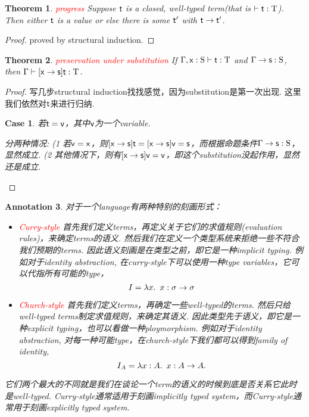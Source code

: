 \documentclass{article}
\theoremstyle{plain}
\newtheorem{theorem}{Theorem}
\newtheorem{annotation}[theorem]{Annotation}
\newtheorem{case}{Case}
\theoremstyle{nonumberplain}
\newtheorem{proof}{Proof}
\newcommand{\lam}[2]{\ensuremath{\lambda #1\ldotp~ #2}} %
\newcommand{\singletype}[1]{\text{#1}}
\newcommand{\termtype}[2]{\ensuremath{#1:#2}}
\newcommand{\term}[1]{\ensuremath\mathsf{#1}}
\newcommand{\redt}[1]{\textcolor{red}{#1}}
\begin{document}
\begin{theorem}
\rm \redt{progress} Suppose $\term{t}$ is a closed, well-typed term(that is $\vdash \termtype{\term{t}}{\singletype{T}}$). Then either $\term{t}$ is a value or else there is some $\term{t}'$ with $\term{t} \to \term{t}'$. 
\end{theorem}

\begin{proof}
proved by structural induction.
\end{proof}

\begin{theorem}
\rm \redt{preservation under substitution} If $\Gamma,  \termtype{\term{x}}{\singletype{S}} \vdash \termtype{\term{t}}{\singletype{T}}$ and $\Gamma \to \termtype{\term{s}}{\singletype{S}}$, then $\Gamma \vdash \termtype{[\term{x} \to \term{s}]\term{t}}{\singletype{T}}$.
\end{theorem}

\begin{proof}
\rm 写几步structural induction找找感觉，因为substitution是第一次出现. 这里我们依然对$\term{t}$来进行归纳.  

\begin{case}
若$\term{t} = \term{v}$，其中$\term{v}$为一个variable. 

分两种情况: (1 若$\term{v} = \term{x}$，则$[\term{x} \to \term{s}]\term{t} = [\term{x} \to \term{s}]\term{v} = \term{s}$，而根据命题条件$\Gamma \to \termtype{\term{s}}{\singletype{S}}$，显然成立. (2 其他情况下，则有$[\term{x} \to \term{s}]\term{v} = \term{v}$，即这个substitution没起作用，显然还是成立. 
\end{case}
\end{proof}

\begin{annotation}
\rm 对于一个language有两种特别的刻画形式：
\begin{itemize}
	\item \redt{Curry-style} 首先我们定义terms，再定义关于它们的求值规则(evaluation rules)，来确定terms的语义. 然后我们在定义一个类型系统来拒绝一些不符合我们预期的terms. 因此语义刻画是在类型之前，即它是一种implicit typing. 例如对于identity abstraction, 在curry-style下可以使用一种type variables，它可以代指所有可能的type， 
	$$
	I = \lam{x}{x} : \sigma \to \sigma
	$$ 
	\item \redt{Church-style} 首先我们定义terms，再确定一些well-typed的terms. 然后只给well-typed terms制定求值规则，来确定其语义. 因此类型先于语义，即它是一种explicit typing，也可以看做一种ploymorphism. 例如对于identity abstraction, 对每一种可能type，在church-style下我们都可以得到family of identity,
	$$
	I_A = \lam{x:A}{x} : A \to A.
	$$
\end{itemize}
它们两个最大的不同就是我们在谈论一个term的语义的时候到底是否关系它此时是well-typed. Curry-style通常适用于刻画implicitly typed system，而Curry-style通常用于刻画explicitly typed system. 
\end{annotation}
\end{document}
